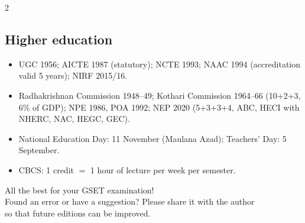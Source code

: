 \begin{multicols}{2}
\subsection*{Higher education}
\begin{itemize}
\item UGC 1956; AICTE 1987 (statutory); NCTE 1993; NAAC 1994 (accreditation valid 5 years); NIRF 2015/16.
\item Radhakrishnan Commission 1948--49; Kothari Commission 1964--66 (10+2+3, 6\% of GDP); NPE 1986, POA 1992; NEP 2020 (5+3+3+4, ABC, HECI with NHERC, NAC, HEGC, GEC).
\item National Education Day: 11 November (Maulana Azad); Teachers' Day: 5 September.
\item CBCS: 1 credit $=$ 1 hour of lecture per week per semester.
\end{itemize}
\end{multicols}
\normalsize

\vfill
\begin{center}
\begin{tcolorbox}[colback=soft,colframe=brand,width=0.85\linewidth,halign=center]
\sffamily\large All the best for your GSET examination!\\[4pt]
\normalsize\rmfamily Found an error or have a suggestion? Please share it with the author\\ so that future editions can be improved.
\end{tcolorbox}
\end{center}
